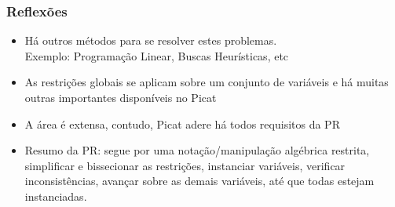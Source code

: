 \begin{frame}[fragile]
\frametitle{Reflexões}


\begin{itemize}
  \item Há outros métodos para se resolver estes problemas.\\
  Exemplo: Programação Linear, Buscas Heurísticas, etc

  \pause  
  \item As restrições globais se aplicam sobre um conjunto de variáveis
  e há muitas outras importantes disponíveis no Picat

  \pause
  \item A área é extensa, contudo, Picat adere há todos requisitos da PR

    \pause
  \item Resumo da PR: segue por uma notação/manipulação algébrica restrita,
        simplificar e bissecionar as restrições, instanciar variáveis, 
        verificar inconsistências,
        avançar sobre as demais variáveis, até que todas 
        estejam instanciadas.
  
\end{itemize}

\end{frame}
